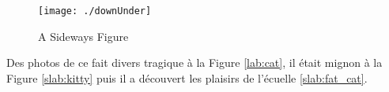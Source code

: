   \begin{sidewaysfigure}
    \centering
    \texttt{[image: ./downUnder]}
    \caption{A Sideways  Figure}
    \label{fig:sideways}
  \end{sidewaysfigure}
    Des  photos  de ce fait  divers  tragique à la  Figure \ref{lab:cat}, il était  mignon à la  Figure \ref{slab:kitty} puis il a découvert les  plaisirs  de l’écuelle \ref{slab:fat_cat}.
